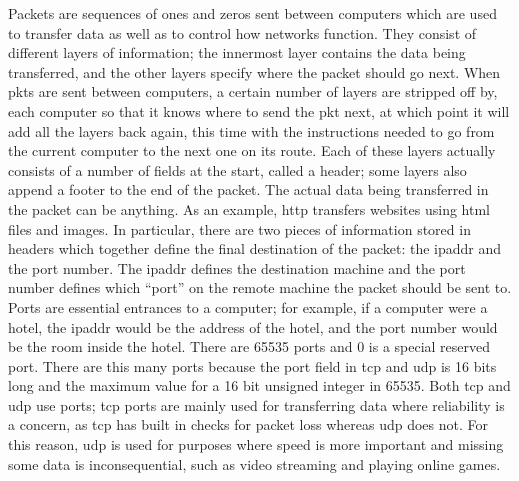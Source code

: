 \documentclass[titlepage]{article}
\begin{document}
Packets\label{packetdef} are sequences of ones and zeros sent between computers which 
are used to transfer data as well as to control how networks function. They consist of different 
layers of information; the innermost layer contains the data being transferred, and the other
layers specify where the packet should go next.
When \glspl{pkt} are sent between computers, a certain number of layers are stripped off by,
each computer so that it knows where to send the \gls{pkt} next, at which point it will add
all the layers back again, this time with the instructions needed to go from the current computer
to the next one on its route. Each of these layers actually consists of a number of fields at the
start, called a \gls{header}; some layers also append a footer to the end of the packet.
The actual data being transferred in the packet can be anything.
As an example, \gls{http} transfers websites using \gls{html} files and images. In particular,
there are two pieces of information stored in headers which together define the final destination
of the packet: the \gls{ipaddr} and the \gls{port} number.
The \gls{ipaddr} defines the destination machine and the \gls{port} number
defines which ``port'' on the remote machine the packet should be sent to. Ports are essential
entrances to a computer; for example, if a computer were a hotel, the \gls{ipaddr} would be the
address of the hotel, and the \gls{port} number would be the room inside the hotel.
There are 65535 \glspl{port} and 0 is a special reserved port\cite{wiki:ports}.
There are this many ports because the port field in \gls{tcp}\cite{rfc:tcp} and \gls{udp}\cite{rfc:udp}
is 16 bits long and the maximum value for a 16 bit unsigned integer in 65535.
Both \gls{tcp}\cite{wiki:tcp} and \gls{udp}\cite{wiki:udp} use \glspl{port}; \gls{tcp} \glspl{port} are mainly used for
transferring data where reliability is a concern, as \gls{tcp} has built in checks for packet loss
whereas \gls{udp} does not.
For this reason, \gls{udp} is used for purposes where speed is more important
and missing some data is inconsequential, such as video streaming and playing online games\cite{wiki:udp}. 
\end{document}
